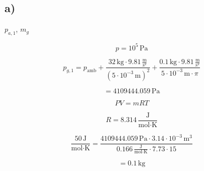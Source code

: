 

\subsection*{a)}
$p_{a,1}$, $m_g$

\[
p = 10^5 \, \text{Pa}
\]

\[
p_{g,1} = p_{\text{amb}} + \frac{32 \, \text{kg} \cdot 9.81 \, \frac{\text{m}}{\text{s}^2}}{\left(5 \cdot 10^{-3} \, \text{m}\right)^2} + \frac{0.1 \, \text{kg} \cdot 9.81 \, \frac{\text{m}}{\text{s}^2}}{5 \cdot 10^{-3} \, \text{m} \cdot \pi}
\]

\[
= 4109444.059 \, \text{Pa}
\]

\[
PV = mRT
\]

\[
R = 8.314 \, \frac{\text{J}}{\text{mol} \cdot \text{K}}
\]

\[
\frac{50 \, \text{J}}{\text{mol} \cdot \text{K}} = \frac{4109444.059 \, \text{Pa} \cdot 3.14 \cdot 10^{-3} \, \text{m}^3}{0.166 \, \frac{\text{J}}{\text{mol} \cdot \text{K}} \cdot 7.73 \cdot 15}
\]

\[
= 0.1 \, \text{kg}
\]